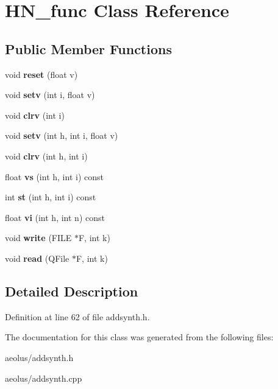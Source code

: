 \hypertarget{class_h_n__func}{}\section{H\+N\+\_\+func Class Reference}
\label{class_h_n__func}
\subsection*{Public Member Functions}
\begin{DoxyCompactItemize}
\item 
\mbox{\label{class_h_n__func_a74b86ceff5590a1973c73e4ee878a608}} 
void {\bfseries reset} (float v)
\item 
\mbox{\label{class_h_n__func_ad25652685ef73c89b0357a9ce6072c92}} 
void {\bfseries setv} (int i, float v)
\item 
\mbox{\label{class_h_n__func_ad42dcbf71de8ff5be33a908cd1867ef1}} 
void {\bfseries clrv} (int i)
\item 
\mbox{\label{class_h_n__func_a6339530db8a16706d2ebd2122dbf24cb}} 
void {\bfseries setv} (int h, int i, float v)
\item 
\mbox{\label{class_h_n__func_afe82b5b2498efd1a3b7d946eef2e161e}} 
void {\bfseries clrv} (int h, int i)
\item 
\mbox{\label{class_h_n__func_ad6fdb8d5c9ee7bef0d038b9b7d402521}} 
float {\bfseries vs} (int h, int i) const
\item 
\mbox{\label{class_h_n__func_ab20c8897f7407625a424d4bbd005236c}} 
int {\bfseries st} (int h, int i) const
\item 
\mbox{\label{class_h_n__func_a3d1e5d1b533328b3d63e1476ee14e75d}} 
float {\bfseries vi} (int h, int n) const
\item 
\mbox{\label{class_h_n__func_ae110f79c8941dce6e72f1cdb25a3898e}} 
void {\bfseries write} (F\+I\+LE $\ast$F, int k)
\item 
\mbox{\label{class_h_n__func_ae826f7ddc3abbe61951ff71dc1f2383f}} 
void {\bfseries read} (Q\+File $\ast$F, int k)
\end{DoxyCompactItemize}


\subsection{Detailed Description}


Definition at line 62 of file addsynth.\+h.



The documentation for this class was generated from the following files\+:\begin{DoxyCompactItemize}
\item 
aeolus/addsynth.\+h\item 
aeolus/addsynth.\+cpp\end{DoxyCompactItemize}
